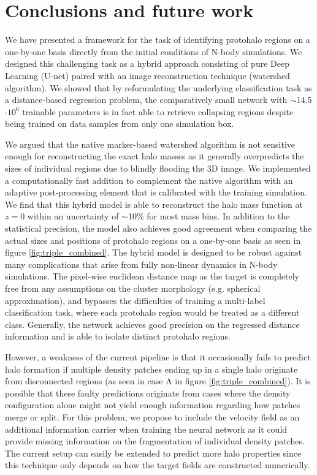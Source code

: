 \documentclass[fleqn,usenatbib]{mnras}
\begin{document}
\section{Conclusions and future work}
\label{sec:conclusion}
We have presented a framework for the task of identifying protohalo regions on a one-by-one basis directly from the initial conditions of N-body simulations. We designed this challenging task as a hybrid approach consisting of pure Deep Learning (U-net) paired with an image reconstruction technique (watershed algorithm). We showed that by reformulating the underlying classification task as a distance-based regression problem, the comparatively small network with $\sim$14.5$\cdot10^{6}$ trainable parameters is in fact able to retrieve collapsing regions despite being trained on data samples from only one simulation box.\par
We argued that the native marker-based watershed algorithm is not sensitive enough for reconstructing the exact halo masses as it generally overpredicts the sizes of individual regions due to blindly flooding the 3D image. We implemented a computationally fast addition to complement the native algorithm with an adaptive post-processing element that is calibrated with the training simulation.  
We find that this hybrid model is able to reconstruct the halo mass function at $z=0$ within an uncertainty of $\sim$10\% for most mass bins. In addition to the statistical precision, the model also achieves good agreement when comparing the actual sizes and positions of protohalo regions on a one-by-one basis as seen in figure \ref{fig:triple_combined}. The hybrid model is designed to be robust against many complications that arise from fully non-linear dynamics in N-body simulations. The pixel-wise euclidean distance map as the target is completely free from any assumptions on the cluster morphology (e.g. spherical approximation), and bypasses the difficulties of training a multi-label classification task, where each protohalo region would be treated as a different class. Generally, the network achieves good precision on the regressed distance information and is able to isolate distinct protohalo regions.\par
However, a weakness of the current pipeline is that it occasionally fails to predict halo formation if multiple density patches ending up in a single halo originate from disconnected regions (as seen in case A in figure \ref{fig:triple_combined}). It is possible that these faulty predictions originate from cases where the density configuration alone might not yield enough information regarding how patches merge or split. For this problem, we propose to include the velocity field as an additional information carrier when training the neural network as it could provide missing information on the fragmentation of individual density patches. The current setup can easily be extended to predict more halo properties since this technique only depends on how the target fields are constructed numerically.
\end{document}
